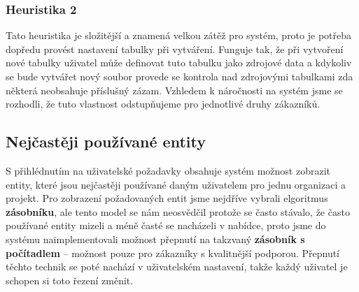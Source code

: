 \subsubsection{Heuristika 2}
\par Tato heuristika je složitější a znamená velkou zátěž pro systém, proto je potřeba dopředu provést nastavení tabulky při vytváření. Funguje tak, že při vytvoření nové tabulky uživatel může definovat tuto tabulku jako zdrojové data a kdykoliv se bude vytvářet nový soubor provede se kontrola nad zdrojovými tabulkami zda některá neobsahuje příslušný zázam. Vzhledem k náročnosti na systém jsme se rozhodli, že tuto vlastnost odstupňujeme pro jednotlivé druhy zákazníků.

\subsection{Nejčastěji používané entity}
\par S přihlédnutím na uživatelské požadavky obsahuje systém možnost zobrazit entity, které jsou nejčastěji používané daným uživatelem pro jednu organizaci a projekt. Pro zobrazení požadovaných entit jsme nejdříve vybrali elgoritmus \textbf{zásobníku}, ale tento model se nám neosvědčil protože se často stávalo, že často používané entity mizeli a méně časté se nacházeli v nabídce, proto jsme do systému naimplementovali možnost přepnutí na takzvaný \textbf{zásobník s počítadlem} -- možnost pouze pro zákazníky s kvalitnější podporou. Přepnutí těchto technik se poté nachází v uživatelském nastavení, takže každý uživatel je schopen si toto řezení změnit.

